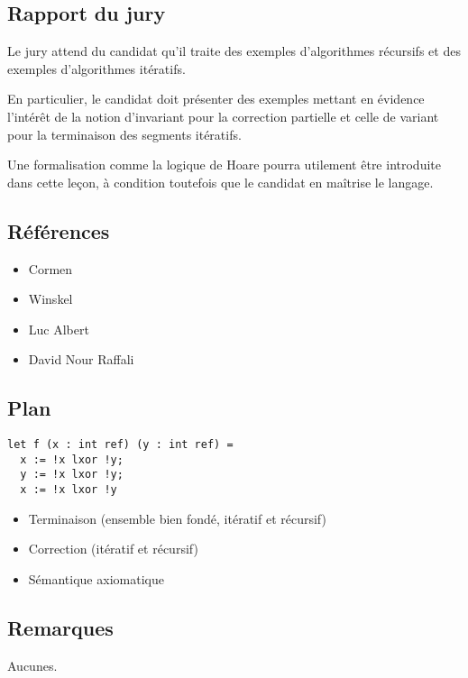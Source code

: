 \documentclass[../../agregation.tex]{subfiles}
\begin{document}

\subsection{Rapport du jury}

\begin{aquote}{}
Le jury attend du candidat qu'il traite des exemples d'algorithmes récursifs et des exemples d'algorithmes itératifs.

En particulier, le candidat doit présenter des exemples mettant en évidence l'intérêt de la notion d'invariant pour la correction partielle et celle de variant pour la terminaison des segments itératifs.

Une formalisation comme la logique de Hoare pourra utilement être introduite dans cette leçon, à condition toutefois que le candidat en maîtrise le langage.
\end{aquote}

\dvts

\subsection{Références}

\begin{itemize}
	\item Cormen
	\item Winskel
	\item Luc Albert
	\item David Nour Raffali
\end{itemize}

\subsection{Plan}

\begin{lstlisting}[language=caml]
let f (x : int ref) (y : int ref) =
  x := !x lxor !y;
  y := !x lxor !y;
  x := !x lxor !y
\end{lstlisting}

\begin{itemize}
	\item Terminaison (ensemble bien fondé, itératif et récursif)
	\item Correction (itératif et récursif)
	\item Sémantique axiomatique
\end{itemize}

\subsection{Remarques}

Aucunes.
\end{document}
